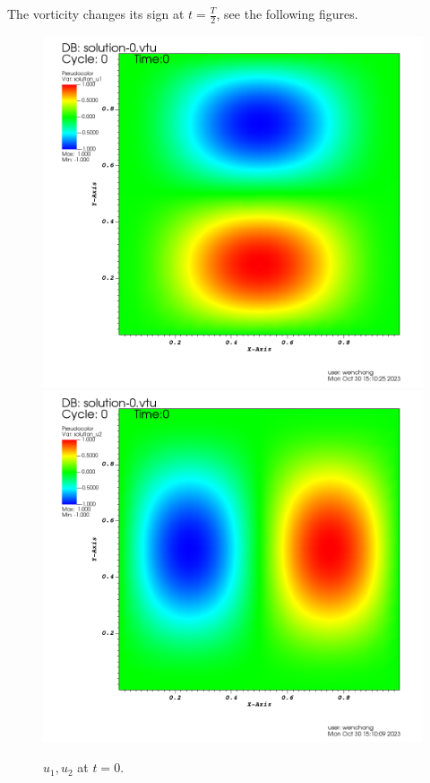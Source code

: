 \documentclass[lang=en,11pt,a4paper]{elegantpaper}
\begin{document}
The vorticity changes its sign at $t=\frac{T}{2}$, see the following figures.
\begin{figure}[H]
    \centering
    \begin{minipage}[t]{0.4\linewidth}
        \centering
        \includegraphics[width=0.8\linewidth]{png/ux_t=0.png}
        \includegraphics[width=0.8\linewidth]{png/uy_t=0.png}
        \caption*{\small $u_1,u_2$ at $t=0$.}
    \end{minipage}
    \begin{minipage}[t]{0.4\linewidth}
        \centering

\end{minipage}
\end{figure}
\end{document}
